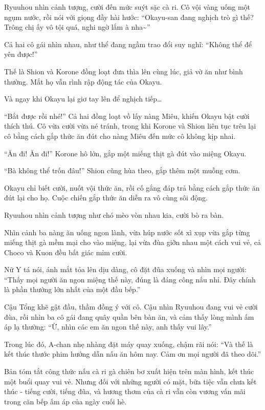 \documentclass[../main.tex]{subfiles}
\begin{document}
Ryuuhou nhìn cảnh tượng, cười đến mức suýt sặc cà ri. Cô vội vàng uống một ngụm nước, rồi nói với giọng đầy hài hước: ``Okayu-san đang nghịch trò gì thế? Trông chị ấy vô tội quá, nghi ngờ lắm à nha\~{}''

Cả hai cô gái nhìn nhau, như thể đang ngầm trao đổi suy nghĩ: ``Không thể để yên được!''

Thế là Shion và Korone đồng loạt đưa thìa lên cùng lúc, giả vờ ăn như bình thường. Mắt họ vẫn rình rập động tác của Okayu.

Và ngay khi Okayu lại giơ tay lên để nghịch tiếp\dots

``Bắt được rồi nhé!'' Cả hai đồng loạt vồ lấy nàng Miêu, khiến Okayu bật cười thích thú. Cô vừa cười vừa né tránh, trong khi Korone và Shion liên tục trêu lại cô bằng cách gắp thức ăn đút cho nàng Miêu đến mức cô không kịp nhai.

``Ăn đi! Ăn đi!'' Korone hô lớn, gắp một miếng thịt gà đút vào miệng Okayu.

``Bà không thể trốn đâu!'' Shion cũng hùa theo, gắp thêm một muỗng cơm.

Okayu chỉ biết cười, nuốt vội thức ăn, rồi cố gắng đáp trả bằng cách gắp thức ăn đút lại cho họ. Cuộc chiến gắp thức ăn diễn ra vô cùng sôi động.

Ryuuhou nhìn cảnh tượng như chó mèo vòn nhau kia, cười bò ra bàn.

Nhìn cảnh ba nàng ăn uống ngon lành, vừa húp nước sốt xì xụp vừa gắp từng miếng thịt gà mềm mại cho vào miệng, lại vừa đùa giỡn nhau một cách vui vẻ, cả Choco và Kuon đều bất giác mỉm cười.

Nữ Y tá nói, ánh mắt tỏa lên dịu dàng, cô đặt đũa xuống và nhìn mọi người: ``Thấy mọi người ăn ngon miệng thế này, đúng là đáng công nấu nhỉ. Đây chính là phần thưởng lớn nhất của một đầu bếp.''

Cậu Tổng khẽ gật đầu, thầm đồng ý với cô. Cậu nhìn Ryuuhou đang vui vẻ cười đùa, rồi nhìn ba cô gái đang quây quần bên bàn ăn, và cảm thấy lòng mình ấm áp lạ thường: ``Ừ, nhìn các em ăn ngon thế này, anh thấy vui lây.''

Trong lúc đó, A-chan nhẹ nhàng đặt máy quay xuống, chậm rãi nói: ``Và thế là kết thúc thước phim hướng dẫn nấu ăn hôm nay. Cảm ơn mọi người đã theo dõi.''

Bản tóm tắt công thức nấu cà ri gà chiên bơ xuất hiện trên màn hình, kết thúc một buổi quay vui vẻ. Nhưng đối với những người có mặt, bữa tiệc vẫn chưa kết thúc - tiếng cười, tiếng đũa, và hương thơm của cà ri vẫn còn vương vấn mãi trong căn bếp ấm áp của ngày cuối hè.
\end{document}
